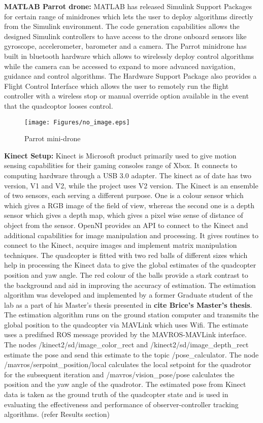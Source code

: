 \documentclass{article}
\begin{document}
\textbf{MATLAB Parrot drone:} MATLAB has released Simulink Support Packages for certain range of minidrones which lets the user to deploy algorithms directly from the Simulink environment. The code generation capabilities allows the designed Simulink controllers to have access to the drone onboard sensors like gyroscope, accelerometer, barometer and a camera. The Parrot minidrone has built in bluetooth hardware which allows to wirelessly deploy control algorithms while the camera can be accessed to expand to more advanced navigation, guidance and control algorithms. The Hardware Support Package also provides a Flight Control Interface which allows the user to remotely run the flight controller with a wireless stop or manual override option available in the event that the quadcoptor looses control. 
\begin{figure}[H]
\centering
\texttt{[image: Figures/no\_image.eps]}
\caption{Parrot mini-drone}
\label{parrot_drone}
\end{figure}

\textbf{Kinect Setup:} Kinect is Microsoft product primarily used to give motion sensing capabilities for their gaming consoles range of Xbox. It connects to computing hardware through a USB 3.0 adapter. The kinect as of date has two version, V1 and V2, while the project uses V2 version. The Kinect is an ensemble of two sensors, each serving a different purpose. One is a colour sensor which which gives a RGB image of the field of view, whereas the second one is a depth sensor which gives a depth map, which gives a pixel wise sense of distance of object from the sensor. OpenNI provides an API to connect to the Kinect and additional capabilities for image manipulation and processing. It gives routines to connect to the Kinect, acquire images and implement matrix manipulation techniques. The quadcopter is fitted with two red balls of different sizes which help in processing the Kinect data to give the global estimates of the quadcopter position and yaw angle. The red colour of the balls provide a stark contrast to the background and aid in improving the accuracy of estimation.
The estimation algorithm was developed and implemented by a former Graduate student of the lab as a part of his Master's thesis presented in \textbf{cite Brice's Master's thesis}. The estimation algorithm runs on the ground station computer and transmits the global position to the quadcopter via MAVLink which uses Wifi. The estimate uses a predifned ROS message provided by the MAVROS-MAVLink interface. The nodes /kinect2/sd/image\_color\_rect and /kinect2/sd/image\_depth\_rect estimate the pose and send this estimate to the topic /pose\_calculator. The node /mavros/serpoint\_position/local calculates the local setpoint for the quadrotor for the subsequent iteration and /mavros/vision\_pose/pose calculates the position and the yaw angle of the quadrotor. The estimated pose from Kinect data is taken as the ground truth of the quadcopter state and is used in evaluating the effectiveness and performance of observer-controller tracking algorithms. (refer Results section)
\end{document}
